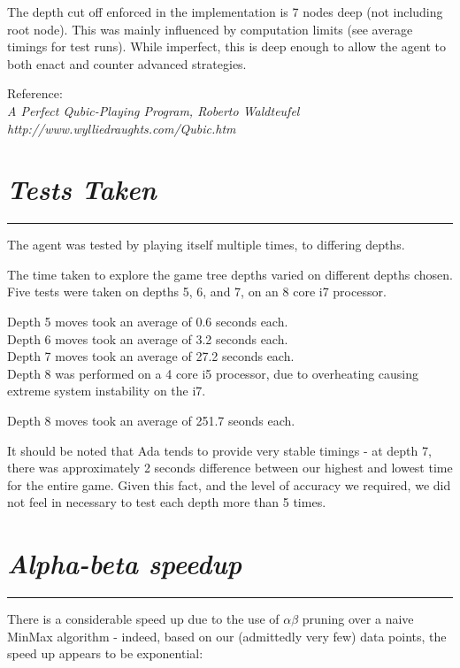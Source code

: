 \documentclass[10pt]{report}
\begin{document}
\begin{multicols}{2}
The depth cut off enforced in the implementation is 7 nodes deep (not including root node). This was mainly influenced by computation limits (see average timings for test runs). While imperfect, this is deep enough to allow the agent to both enact and counter advanced strategies.

Reference: \\
\em A Perfect Qubic-Playing Program\em, Roberto Waldteufel\\
http://www.wylliedraughts.com/Qubic.htm

\section*{\emph{{Tests Taken}}}
\hrule
\vspace{0.4cm}

The agent was tested by playing itself multiple times, to differing depths.

The time taken to explore the game tree depths varied on different depths chosen. Five tests were taken on depths 5, 6, and 7, on an 8 core i7 processor.

Depth 5 moves took an average of 0.6 seconds each.\\
Depth 6 moves took an average of 3.2 seconds each.\\
Depth 7 moves took an average of 27.2 seconds each.\\

Depth 8 was performed on a 4 core i5 processor, due to overheating causing extreme system instability on the i7.

Depth 8 moves took an average of 251.7 seonds each.

It should be noted that Ada tends to provide very stable timings - at depth 7, there was approximately 2 seconds difference between our highest and lowest time for the entire game. Given this fact, and the level of accuracy we required, we did not feel in necessary to test each depth more than 5 times.

\section*{\emph{\textmd{Alpha-beta speedup}}}
\hrule
\vspace{0.4cm}

There is a considerable speed up due to the use of $\alpha\beta$  pruning over a naive MinMax algorithm - indeed, based on our (admittedly very few) data points, the speed up appears to be exponential:


\end{multicols}
\end{document}
